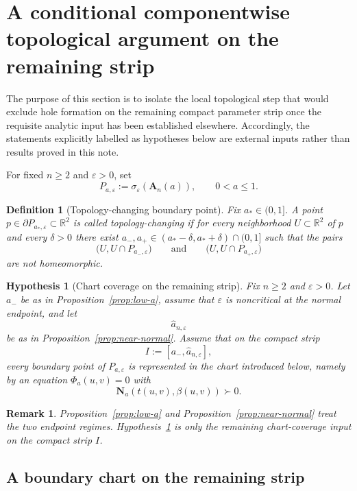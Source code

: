 \documentclass[11pt]{article}
\newtheorem{remark}[theorem]{Remark}
\newtheorem{definition}[theorem]{Definition}
\newtheorem{hypothesis}[theorem]{Hypothesis}
\newcommand{\R}{\mathbb{R}}
\begin{document}
\section{A conditional componentwise topological argument on the remaining strip}

The purpose of this section is to isolate the local topological step that would exclude hole formation on the remaining compact parameter strip once the requisite analytic input has been established elsewhere. Accordingly, the statements explicitly labelled as hypotheses below are external inputs rather than results proved in this note.

For fixed \(n\ge 2\) and \(\varepsilon>0\), set
\[
P_{a,\varepsilon}:=\sigma_\varepsilon(\mathbf A_n(a)),
\qquad 0<a\le 1.
\]

\begin{definition}[Topology-changing boundary point]\label{def:topology-changing}
Fix \(a_*\in(0,1]\). A point \(p\in \partial P_{a_*,\varepsilon}\subset\R^2\) is called \emph{topology-changing} if for every neighborhood \(U\subset\R^2\) of \(p\) and every \(\delta>0\) there exist \(a_-,a_+\in (a_* -\delta,a_*+\delta)\cap(0,1]\) such that the pairs
\[
\bigl(U,U\cap P_{a_-,\varepsilon}\bigr)
\qquad\text{and}\qquad
\bigl(U,U\cap P_{a_+,\varepsilon}\bigr)
\]
are not homeomorphic.
\end{definition}

\begin{hypothesis}[Chart coverage on the remaining strip]\label{hyp:standing-input}
Fix \(n\ge 2\) and \(\varepsilon>0\). Let \(a_-\) be as in Proposition~\ref{prop:low-a}, assume that \(\varepsilon\) is noncritical at the normal endpoint, and let
\[
\widehat a_{n,\varepsilon}
\]
be as in Proposition~\ref{prop:near-normal}. Assume that on the compact strip
\[
I:=[a_-,\widehat a_{n,\varepsilon}],
\]
every boundary point of \(P_{a,\varepsilon}\) is represented in the chart introduced below, namely by an equation \(\Phi_a(u,v)=0\) with
\[
\mathbf N_a(t(u,v),\beta(u,v))\succ 0.
\]
\end{hypothesis}

\begin{remark}
Proposition~\ref{prop:low-a} and Proposition~\ref{prop:near-normal} treat the two endpoint regimes. Hypothesis~\ref{hyp:standing-input} is only the remaining chart-coverage input on the compact strip \(I\).
\end{remark}

\subsection*{A boundary chart on the remaining strip}
\end{document}
